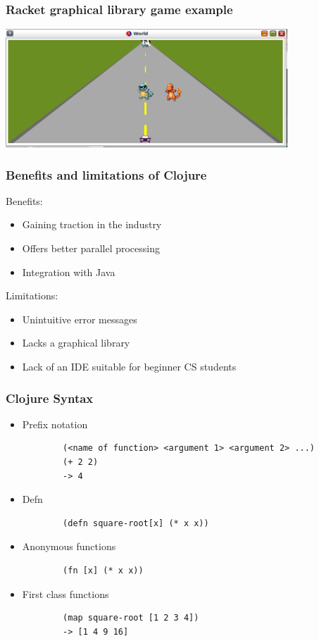 \documentclass{beamer}
\begin{document}
\begin{frame}
\frametitle{Racket graphical library game example}
\begin{center}
\includegraphics[width=300pt]{racketGameExample}
\end{center}
\end{frame}

\begin{frame}
\frametitle{Benefits and limitations of Clojure}
Benefits:
\begin{itemize}
\item Gaining traction in the industry
\item Offers better parallel processing
\item Integration with Java
\end{itemize}
Limitations:
\begin{itemize}
\item Unintuitive error messages
\item Lacks a graphical library
\item Lack of an IDE suitable for beginner CS students
\end{itemize}
\end{frame}

\begin{frame}[fragile]
\frametitle{Clojure Syntax}
\begin{itemize}
	\item Prefix notation			
	\begin{verbatim}
		(<name of function> <argument 1> <argument 2> ...)
		(+ 2 2)
		-> 4
	\end{verbatim}
	\item Defn
	\begin{verbatim}
		(defn square-root[x] (* x x))
	\end{verbatim}
	\item Anonymous functions
	\begin{verbatim}
		(fn [x] (* x x))
	\end{verbatim}
	\item First class functions
	\begin{verbatim}
		(map square-root [1 2 3 4])
		-> [1 4 9 16]
	\end{verbatim}
\end{itemize}
\end{frame}
\end{document}
